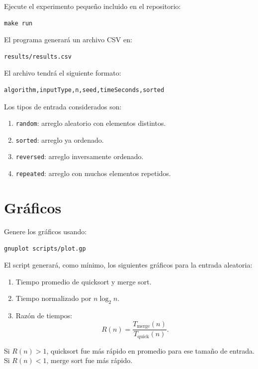 \documentclass[11pt,a4paper]{article}
\begin{document}
Ejecute el experimento pequeño incluido en el repositorio:

\begin{verbatim}
make run
\end{verbatim}

El programa generará un archivo CSV en:

\begin{verbatim}
results/results.csv
\end{verbatim}

El archivo tendrá el siguiente formato:

\begin{verbatim}
algorithm,inputType,n,seed,timeSeconds,sorted
\end{verbatim}

Los tipos de entrada considerados son:

\begin{enumerate}[label=\alph*)]
  \item \texttt{random}: arreglo aleatorio con elementos distintos.
  \item \texttt{sorted}: arreglo ya ordenado.
  \item \texttt{reversed}: arreglo inversamente ordenado.
  \item \texttt{repeated}: arreglo con muchos elementos repetidos.
\end{enumerate}

\section{Gráficos}

Genere los gráficos usando:

\begin{verbatim}
gnuplot scripts/plot.gp
\end{verbatim}

El script generará, como mínimo, los siguientes gráficos para la entrada aleatoria:

\begin{enumerate}[label=\arabic*.]
  \item Tiempo promedio de quicksort y merge sort.
  \item Tiempo normalizado por $n\log_2 n$.
  \item Razón de tiempos:
  \[
  R(n)=\frac{T_{\text{merge}}(n)}{T_{\text{quick}}(n)}.
  \]
\end{enumerate}

Si $R(n)>1$, quicksort fue más rápido en promedio para ese tamaño de entrada. Si $R(n)<1$, merge sort fue más rápido.
\end{document}
